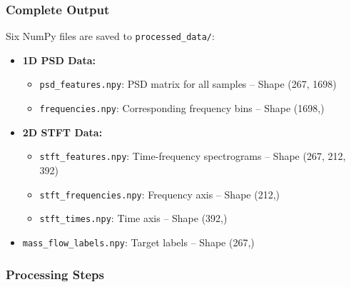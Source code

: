 \subsubsection{Complete Output}
Six NumPy files are saved to \verb|processed_data/|:
\begin{itemize}
    \item \textbf{1D PSD Data:}
    \begin{itemize}
        \item \verb|psd_features.npy|: PSD matrix for all samples -- Shape (267, 1698)
        \item \verb|frequencies.npy|: Corresponding frequency bins -- Shape (1698,)
    \end{itemize}
    \item \textbf{2D STFT Data:}
    \begin{itemize}
        \item \verb|stft_features.npy|: Time-frequency spectrograms -- Shape (267, 212, 392)
        \item \verb|stft_frequencies.npy|: Frequency axis -- Shape (212,)
        \item \verb|stft_times.npy|: Time axis -- Shape (392,)
    \end{itemize}
    \item \verb|mass_flow_labels.npy|: Target labels -- Shape (267,)
\end{itemize}

\subsubsection{Processing Steps}

